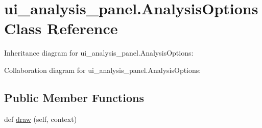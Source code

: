 \hypertarget{classui__analysis__panel_1_1AnalysisOptions}{}\section{ui\+\_\+analysis\+\_\+panel.\+Analysis\+Options Class Reference}
\label{classui__analysis__panel_1_1AnalysisOptions}


 




Inheritance diagram for ui\+\_\+analysis\+\_\+panel.\+Analysis\+Options\+:


Collaboration diagram for ui\+\_\+analysis\+\_\+panel.\+Analysis\+Options\+:
\subsection*{Public Member Functions}
\begin{DoxyCompactItemize}
\item 
def \hyperlink{classui__analysis__panel_1_1AnalysisOptions_a822167ea4f7d6e3bb13a4e0b86645d77}{draw} (self, context)
\end{DoxyCompactItemize}
